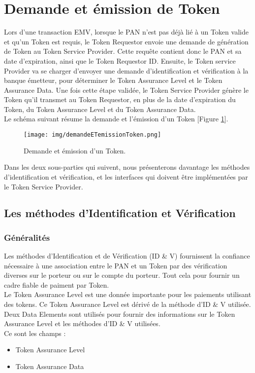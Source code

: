 \documentclass{report}
\begin{document}
\section{Demande et émission de Token}
Lors d'une transaction EMV, lorsque le PAN n'est pas déjà lié à un Token valide et qu'un Token est requis, le Token Requestor envoie une demande de génération de Token au Token Service Provider. Cette requête contient donc le PAN et sa date d'expiration, ainsi que le Token Requestor ID. Ensuite, le Token service Provider va se charger d'envoyer une demande d'identification et vérification à la banque émetteur, pour déterminer le Token Assurance Level et le Token Assurance Data. Une fois cette étape validée, le Token Service Provider génère le Token qu'il transmet au Token Requestor, en plus de la date d'expiration du Token, du Token Assurance Level et du Token Assurance Data.\\

\noindent
Le schéma suivant résume la demande et l'émission d'un Token [Figure \ref{DemandeEmissionToken}].

\begin{figure}[!ht]
    \centering
			\texttt{[image: img/demandeETemissionToken.png]}
			\caption{\label{DemandeEmissionToken} Demande et émission d'un Token.}			
\end{figure}

Dans les deux sous-parties qui suivent, nous présenterons davantage les méthodes d'identification et vérification, et les interfaces qui doivent être implémentées par le Token Service Provider.

\subsection{Les méthodes d'Identification et Vérification}

\subsubsection{Généralités}
Les méthodes d'Identification et de Vérification (ID \& V) fournissent la confiance nécessaire à une association entre le PAN et un Token par des vérification diverses sur le porteur ou sur le compte du porteur. Tout cela pour fournir un cadre fiable de paiment par Token. \\
Le Token Assurance Level est une donnée importante pour les paiements utilisant des tokens. Ce Token Assurance Level est dérivé de la méthode d'ID \& V utilisée.
Deux Data Elements sont utilisés pour fournir des informations sur le Token Assurance Level et les méthodes d'ID \& V utilisées.\\
Ce sont les champs : 
\begin{itemize}
	\item Token Assurance Level
	\item Token Assurance Data\\
\end{itemize}
\end{document}
